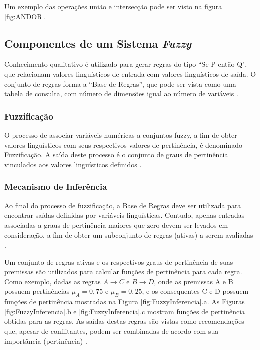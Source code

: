 Um exemplo das operações união e intersecção pode ser visto na figura
\ref{fig:ANDOR}.



\subsection{Componentes de um Sistema \textit{Fuzzy}}

Conhecimento qualitativo é utilizado para gerar regras do tipo ``Se P
então Q", que relacionam valores linguísticos de entrada com valores
linguísticos de saída. O conjunto de regras forma a ``Base de Regras'', que
pode ser vista como uma tabela de consulta, com número de dimensões igual
ao número de variáveis \cite{fuzzy_passino}.

	\subsubsection{Fuzzificação}
	
	O processo de associar variáveis numéricas a conjuntos fuzzy, a fim de obter
	valores linguísticos com seus respectivos valores de pertinência, é denominado
	Fuzzificação. A saída deste processo é o conjunto de graus de pertinência
	vinculados aos valores linguísticos definidos \cite{fuzzy_passino}.
	
	\subsubsection{Mecanismo de Inferência}
	
	Ao final do processo de fuzzificação, a Base de Regras deve ser utilizada para
	encontrar saídas definidas por variáveis linguísticas. Contudo, apenas entradas
	associadas a graus de pertinência maiores que zero devem ser levados em
	consideração, a fim de obter um subconjunto de regras (ativas) a serem
	avaliadas \cite{fuzzy_passino}.
	
	Um conjunto de regras ativas e os respectivos graus de pertinência de suas
	premissas são utilizados para calcular funções de pertinência para cada regra.
	Como exemplo, dadas as regras $A \rightarrow C$ e $B \rightarrow D$, onde as
	premissas A e B possuem pertinências $\mu_A = 0,75$ e $\mu_B = 0,25$, e os
	consequentes C e D possuem funções de pertinência mostradas na Figura
	\ref{fig:FuzzyInferencia}.a. As Figuras \ref{fig:FuzzyInferencia}.b e
	\ref{fig:FuzzyInferencia}.c mostram funções de pertinência obtidas para as
	regras. As saídas destas regras são vistas como	recomendações que, apesar de
	conflitantes, podem ser combinadas de acordo com sua importância (pertinência)
	\cite{fuzzy_passino}.
	
